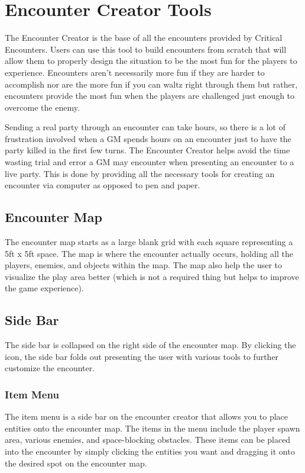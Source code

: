 \documentclass[12pt,a4paper]{report}
\begin{document}
	\section{Encounter Creator Tools}
	The Encounter Creator is the base of all the encounters provided by Critical Encounters. Users can use this tool to build encounters from scratch that will allow them to properly design the situation to be the most fun for the players to experience. Encounters aren't necessarily more fun if they are harder to accomplish nor are the more fun if you can waltz right through them but rather, encounters provide the most fun when the players are challenged just enough to overcome the enemy. 
	
	Sending a real party through an encounter can take hours, so there is a lot of frustration involved when a GM spends hours on an encounter just to have the party killed in the first few turns. The Encounter Creator helps avoid the time wasting trial and error a GM may encounter when presenting an encounter to a live party. This is done by providing all the necessary tools for creating an encounter via computer as opposed to pen and paper.
		\subsection{Encounter Map}
		The encounter map starts as a large blank grid with each square representing a 5ft x 5ft space. The map is where the encounter actually occurs, holding all the players, enemies, and objects within the map. The map also help the user to visualize the play area better (which is not a required thing but helps to improve the game experience).  
		\subsection{Side Bar}
		The side bar is collapsed on the right side of the encounter map. By clicking the icon, the side bar folds out presenting the user with various tools to further customize the encounter.
			\subsubsection{Item Menu}
			The item menu is a side bar on the encounter creator that allows you to place entities onto the encounter map. The items in the menu include the player spawn area, various enemies, and space-blocking obstacles. These items can be placed into the encounter by simply clicking the entities you want and dragging it onto the desired spot on the encounter map.
\end{document}
